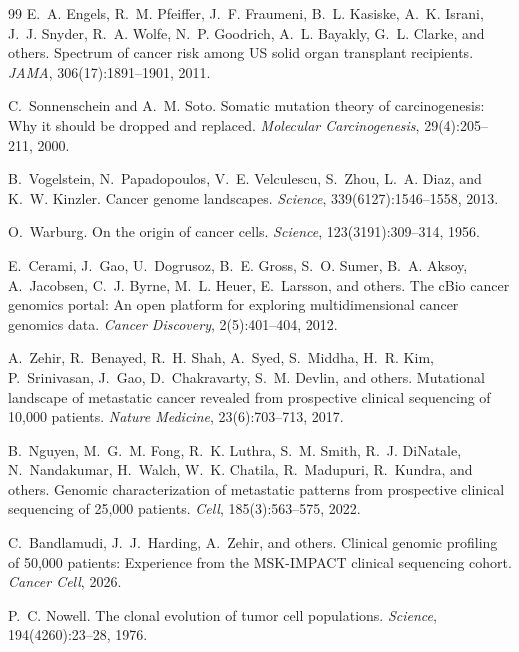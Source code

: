 \documentclass[11pt]{article}
\begin{document}
\begin{thebibliography}{99}
E.~A. Engels, R.~M. Pfeiffer, J.~F. Fraumeni, B.~L. Kasiske,
  A.~K. Israni, J.~J. Snyder, R.~A. Wolfe, N.~P. Goodrich,
  A.~L. Bayakly, G.~L. Clarke, and others.
\newblock Spectrum of cancer risk among {US} solid organ transplant
  recipients.
\newblock \emph{JAMA}, 306(17):1891--1901, 2011.

C.~Sonnenschein and A.~M. Soto.
\newblock Somatic mutation theory of carcinogenesis: Why it should be dropped
  and replaced.
\newblock \emph{Molecular Carcinogenesis}, 29(4):205--211, 2000.

B.~Vogelstein, N.~Papadopoulos, V.~E. Velculescu, S.~Zhou, L.~A. Diaz, and
  K.~W. Kinzler.
\newblock Cancer genome landscapes.
\newblock \emph{Science}, 339(6127):1546--1558, 2013.

O.~Warburg.
\newblock On the origin of cancer cells.
\newblock \emph{Science}, 123(3191):309--314, 1956.

E.~Cerami, J.~Gao, U.~Dogrusoz, B.~E. Gross, S.~O. Sumer,
  B.~A. Aksoy, A.~Jacobsen, C.~J. Byrne, M.~L. Heuer,
  E.~Larsson, and others.
\newblock The {cBio} cancer genomics portal: An open platform for
  exploring multidimensional cancer genomics data.
\newblock \emph{Cancer Discovery}, 2(5):401--404, 2012.

A.~Zehir, R.~Benayed, R.~H. Shah, A.~Syed, S.~Middha,
  H.~R. Kim, P.~Srinivasan, J.~Gao, D.~Chakravarty,
  S.~M. Devlin, and others.
\newblock Mutational landscape of metastatic cancer revealed from
  prospective clinical sequencing of 10,000 patients.
\newblock \emph{Nature Medicine}, 23(6):703--713, 2017.

B.~Nguyen, M.~G.~M. Fong, R.~K. Luthra, S.~M. Smith,
  R.~J. DiNatale, N.~Nandakumar, H.~Walch, W.~K. Chatila,
  R.~Madupuri, R.~Kundra, and others.
\newblock Genomic characterization of metastatic patterns from
  prospective clinical sequencing of 25,000 patients.
\newblock \emph{Cell}, 185(3):563--575, 2022.

C.~Bandlamudi, J.~J.~Harding, A.~Zehir, and others.
\newblock Clinical genomic profiling of 50,000 patients:
  Experience from the {MSK-IMPACT} clinical sequencing cohort.
\newblock \emph{Cancer Cell}, 2026.

P.~C. Nowell.
\newblock The clonal evolution of tumor cell populations.
\newblock \emph{Science}, 194(4260):23--28, 1976.


\end{thebibliography}
\end{document}
